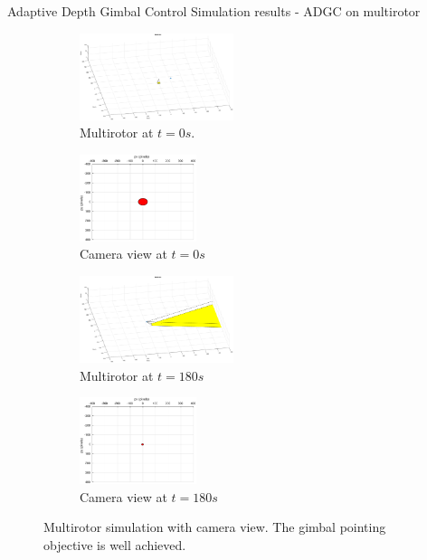 \documentclass[9pt]{beamer}
\newenvironment{figure*}%
{\begin{figure}}
{\end{figure}}
\begin{document}
\begin{frame}{Adaptive Depth Gimbal Control}
Simulation results - ADGC on multirotor
\begin{figure}[htbp]
	\centering
	\begin{subfigure}{0.5\textwidth}
		\centering
		\includegraphics[height=1in]{chapter2/uav_adaptive_0s}
		\caption{Multirotor at $t=0s$.}
	\end{subfigure}%
	\begin{subfigure}{0.5\textwidth}
		\centering
		\includegraphics[height=1in]{chapter2/camera_adaptive_0s}
		\caption{Camera view at $t=0s$}
	\end{subfigure}
	\begin{subfigure}{0.5\textwidth}
		\centering
		\includegraphics[height=1in]{chapter2/uav_adaptive_180s}
		\caption{Multirotor at $t=180s$}
	\end{subfigure}%
	\begin{subfigure}{0.5\textwidth}
		\centering
		\includegraphics[height=1in]{chapter2/camera_adaptive_180s}
		\caption{Camera view at $t=180s$}
	\end{subfigure}					
	\caption{Multirotor simulation with camera view. The gimbal pointing objective is well achieved.}
	\label{uav_adaptive}
\end{figure}
\end{frame}
\end{document}
